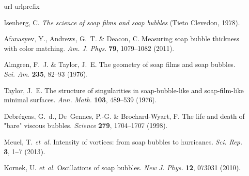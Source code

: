 \documentclass[a4paper,12pt]{article}
\begin{document}
	

	
	\begin{thebibliography}{10}
		\expandafter\ifx\csname url\endcsname\relax
		\def\url#1{\texttt{#1}}\fi
		\expandafter\ifx\csname urlprefix\endcsname\relax\def\urlprefix{URL }\fi
		\providecommand{\bibinfo}[2]{#2}
		\providecommand{\eprint}[2][]{\url{#2}}
		
		\bibinfo{author}{Isenberg, C.}
		\newblock \emph{\bibinfo{title}{{The science of soap films and soap bubbles}}}
		(\bibinfo{publisher}{Tieto Clevedon}, \bibinfo{year}{1978}).
		
		\bibinfo{author}{Afanasyev, Y.}, \bibinfo{author}{Andrews, G.~T.} \&
		\bibinfo{author}{Deacon, C.}
		\newblock \bibinfo{title}{Measuring soap bubble thickness with color matching}.
		\newblock \emph{\bibinfo{journal}{Am. J. Phys.}} \textbf{\bibinfo{volume}{79}},
		\bibinfo{pages}{1079--1082} (\bibinfo{year}{2011}).
		
		\bibinfo{author}{Almgren, F.~J.} \& \bibinfo{author}{Taylor, J.~E.}
		\newblock \bibinfo{title}{The geometry of soap films and soap bubbles}.
		\newblock \emph{\bibinfo{journal}{Sci. Am.}} \textbf{\bibinfo{volume}{235}},
		\bibinfo{pages}{82--93} (\bibinfo{year}{1976}).
		
		\bibinfo{author}{Taylor, J.~E.}
		\newblock \bibinfo{title}{The structure of singularities in soap-bubble-like
			and soap-film-like minimal surfaces}.
		\newblock \emph{\bibinfo{journal}{Ann. Math.}} \textbf{\bibinfo{volume}{103}},
		\bibinfo{pages}{489--539} (\bibinfo{year}{1976}).
		
		\bibinfo{author}{Debr{\'e}geas, G.~d.}, \bibinfo{author}{De~Gennes, P.-G.} \&
		\bibinfo{author}{Brochard-Wyart, F.}
		\newblock \bibinfo{title}{The life and death of "bare" viscous bubbles}.
		\newblock \emph{\bibinfo{journal}{Science}} \textbf{\bibinfo{volume}{279}},
		\bibinfo{pages}{1704--1707} (\bibinfo{year}{1998}).
		
		\bibinfo{author}{Meuel, T.} \emph{et~al.}
		\newblock \bibinfo{title}{Intensity of vortices: from soap bubbles to
			hurricanes}.
		\newblock \emph{\bibinfo{journal}{Sci. Rep.}} \textbf{\bibinfo{volume}{3}},
		\bibinfo{pages}{1--7} (\bibinfo{year}{2013}).
		
		\bibinfo{author}{Kornek, U.} \emph{et~al.}
		\newblock \bibinfo{title}{Oscillations of soap bubbles}.
		\newblock \emph{\bibinfo{journal}{New J. Phys.}} \textbf{\bibinfo{volume}{12}},
		\bibinfo{pages}{073031} (\bibinfo{year}{2010}).
		

\end{thebibliography}
\end{document}
